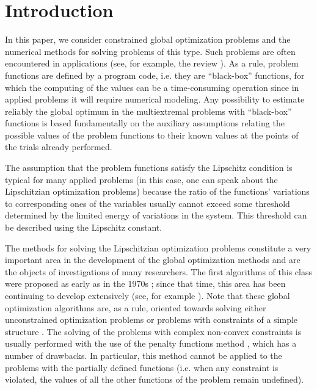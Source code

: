 \documentclass[twocolumn]{svjour3}          %
\begin{document}
\section{Introduction}
\label{intro}
In this paper, we consider constrained global optimization problems and the numerical methods for solving problems of this type. Such problems are often encountered in applications (see, for example, the review \cite{Pinter2006}). As a rule, problem functions are defined by a program code, i.e. they are ``black-box'' functions, for which the computing of the values can be a time-consuming operation since in applied problems it will require  numerical modeling. Any  possibility to estimate reliably the global optimum in the multiextremal problems with ``black-box'' functions is based fundamentally on the auxiliary assumptions relating the possible values of the problem functions to their known values at the points of the trials already performed.
	
	The assumption that the problem functions satisfy the Lipschitz condition is typical for many applied problems (in this case, one can speak about the Lipschitzian optimization problems) because the ratio of the functions’ variations to corresponding ones of the variables usually cannot exceed some threshold determined by the limited energy of variations in the system. This threshold can be described using the Lipschitz constant.
	
	The methods for solving the Lipschitzian optimization problems constitute a very important area in the development of the global optimization methods and are the objects of investigations of many researchers. The first algorithms of this class were proposed as early as in the 1970s \cite{Evtushenko1971,Piyavskii1972,Shubert1972,Strongin1970}; since that time, this area has been continuing to develop extensively (see, for example \cite{Evtushenko2009,Evtushenko2013,Strongin2000,Sergeyev2013,Jones2009}). Note that these global optimization algorithms are, as a rule, oriented towards solving either  unconstrained optimization problems 
	\cite{Paulavicius2014,Sergeyev2015,Pinter1996,Jones1993,Gablonsky2001}
or problems with constraints of a simple structure \cite{Vaz2009,Paulavicius2016}. The solving of the problems with complex non-convex constraints is usually performed with the use of the penalty functions method \cite{Stripinis2019,Pillo2012,Pillo2016}, which has a number of drawbacks.  In particular, this method cannot be applied to the problems with the partially defined functions (i.e. when any constraint is violated, the values of all the other functions of the problem remain undefined).
	
\end{document}
